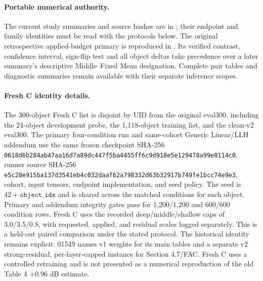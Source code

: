 \documentclass[11pt]{article}
\begin{document}
\paragraph{Portable numerical authority.} The current study summaries and source hashes are in ; their endpoint and family identities must be read with the protocols below. The original retrospective applied-budget primary is reproduced in . Its verified contrast, confidence interval, sign-flip test and all object deltas take precedence over a later summary's descriptive Middle--Fixed Mean designation. Complete pair tables and diagnostic summaries remain available with their separate inference scopes.

\paragraph{Fresh C identity details.} The 300-object Fresh C list is disjoint by UID from the original eval300, including the 24-object development probe, the 1,118-object training list, and the clean-v2 eval300. The primary four-condition run and same-cohort Generic Linear/LLH addendum use the same frozen checkpoint SHA-256 \texttt{0618d6b2\allowbreak{}84ab47aa\allowbreak{}16d7a89d\allowbreak{}c447f5ba\allowbreak{}4455ff6c\allowbreak{}9d918e5e\allowbreak{}129478a9\allowbreak{}9e0114c0}, runner source SHA-256 \texttt{e5c28e915ba137d3541eb4c032daaf62a798332d63b32917b749fe1bcc74e9e3}, cohort, input tensors, endpoint implementation, and seed policy. The seed is $42+\texttt{object\_idx}$ and is shared across the matched conditions for each object. Primary and addendum integrity gates pass for 1,200/1,200 and 600/600 condition rows. Fresh C uses the recorded deep/middle/shallow caps of 3.0/3.5/0.8, with requested, applied, and residual scales logged separately. This is a held-out paired comparison under the stated protocol. The historical identity remains explicit: 01549 names v1 weights for its main tables and a separate v2 strong-residual, per-layer-capped instance for Section 4.7/FAC. Fresh C uses a controlled retraining and is not presented as a numerical reproduction of the old Table 4 $+0.96$ dB estimate.
\end{document}
